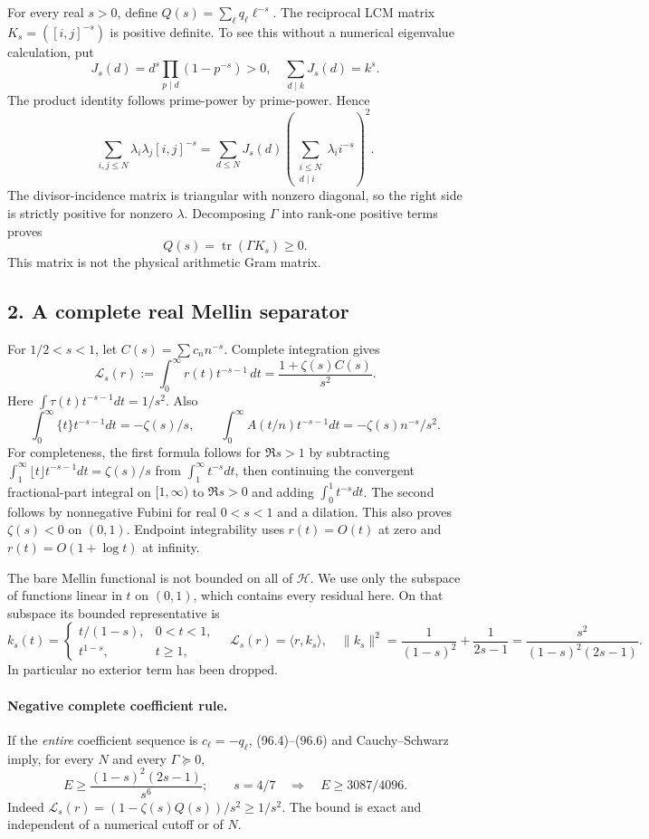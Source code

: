 For every real $s>0$, define $Q(s)=\sum_\ell q_\ell\ell^{-s}$.
The reciprocal LCM matrix $K_s=([i,j]^{-s})$ is positive definite. To see
this without a numerical eigenvalue calculation, put
\[
 J_s(d)=d^s\prod_{p\mid d}(1-p^{-s})>0,
 \quad \sum_{d\mid k}J_s(d)=k^s.
\]
The product identity follows prime-power by prime-power. Hence
\[
 \sum_{i,j\leq N}\lambda_i\lambda_j[i,j]^{-s}
 =\sum_{d\leq N}J_s(d)
     \left(\sum_{\substack{i\leq N\\d\mid i}}\lambda_i i^{-s}\right)^2.
 \tag{96.3}
\]
The divisor-incidence matrix is triangular with nonzero diagonal, so the
right side is strictly positive for nonzero $\lambda$. Decomposing
$\Gamma$ into rank-one positive terms proves
\[
 Q(s)=\operatorname{tr}(\Gamma K_s)\geq0.
 \tag{96.4}
\]
This matrix is not the physical arithmetic Gram matrix.

\subsection*{2. A complete real Mellin separator}
For $1/2<s<1$, let $C(s)=\sum c_n n^{-s}$. Complete integration gives
\[
 \mathcal L_s(r):=\int_0^\infty r(t)t^{-s-1}\,dt
       =\frac{1+\zeta(s)C(s)}{s^2}.
 \tag{96.5}
\]
Here $\int\tau(t)t^{-s-1}dt=1/s^2$. Also
\[
 \int_0^\infty\{t\}t^{-s-1}dt=-\zeta(s)/s,
 \qquad
 \int_0^\infty A(t/n)t^{-s-1}dt=-\zeta(s)n^{-s}/s^2.
\]
For completeness, the first formula follows for $\Re s>1$ by subtracting
$\int_1^\infty\lfloor t\rfloor t^{-s-1}dt=\zeta(s)/s$ from
$\int_1^\infty t^{-s}dt$, then continuing the convergent fractional-part
integral on $[1,\infty)$ to $\Re s>0$ and adding $\int_0^1 t^{-s}dt$.
The second follows by nonnegative Fubini for real $0<s<1$ and a dilation.
This also proves $\zeta(s)<0$ on $(0,1)$. Endpoint integrability uses
$r(t)=O(t)$ at zero and $r(t)=O(1+\log t)$ at infinity.

The bare Mellin functional is not bounded on all of $\mathcal H$. We use
only the subspace of functions linear in $t$ on $(0,1)$, which contains
every residual here. On that subspace its bounded representative is
\[
 k_s(t)=\begin{cases}t/(1-s),&0<t<1,\\t^{1-s},&t\geq1,\end{cases}
 \quad \mathcal L_s(r)=\langle r,k_s\rangle,
 \quad \|k_s\|^2=\frac1{(1-s)^2}+\frac1{2s-1}
       =\frac{s^2}{(1-s)^2(2s-1)}.
 \tag{96.6}
\]
In particular no exterior term has been dropped.

\paragraph{Negative complete coefficient rule.}
If the \emph{entire} coefficient sequence is $c_\ell=-q_\ell$, (96.4)--(96.6)
and Cauchy--Schwarz imply, for every $N$ and every $\Gamma\succeq0$,
\[
 E\geq\frac{(1-s)^2(2s-1)}{s^6};
 \qquad s=4/7\quad\Longrightarrow\quad
 \boxed{E\geq3087/4096}.
 \tag{96.7}
\]
Indeed $\mathcal L_s(r)=(1-\zeta(s)Q(s))/s^2\geq1/s^2$.
The bound is exact and independent of a numerical cutoff or of $N$.

